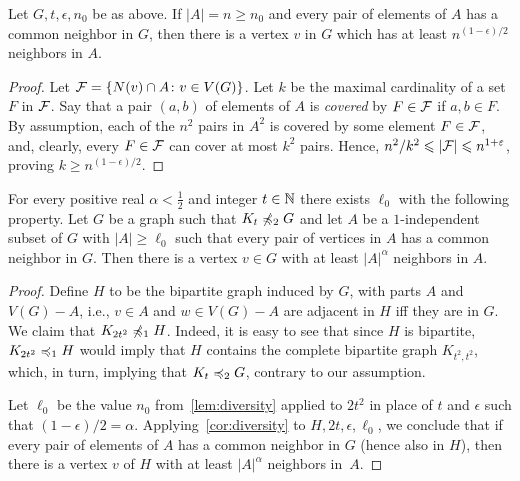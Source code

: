 \begin{corollary}\label{cor:diversity}
  Let $G,t,\epsilon,n_0$ be as above.
  If $|A|=n\ge n_0$ and every pair of elements of $A$ has a common neighbor in $G$,
  then there is a vertex $v$ in $G$ which has at least $n^{(1-\epsilon)/2}$ neighbors in $A$.
\end{corollary}
\begin{proof}Let ${\cal F}=\set{N(v)\cap A\colon v\in V(G)}$. 
  Let $k$ be the maximal cardinality of a set $F$ in ${\cal F}$.
  Say that a pair $(a,b)$ of elements of $A$ is \emph{covered} by $F\in {\cal F}$
  if  $a,b\in F$.
  By assumption, each of the $n^2$ pairs in $A^2$ is covered by some element $F\in {\cal F}$, and,
  clearly, every $F\in {\cal F}$ can cover at most $k^2$ pairs. 
  Hence, $n^2/k^2\le |{\cal F}|\le  n^{1+\epsilon}$, proving $k\ge n^{(1-\epsilon)/2}$.
\end{proof}

\begin{corollary}\label{cor:biversity}
    For every positive real $\alpha<\frac 1 2$ and integer $t\in\N$ there exists $\ell_0$ with the following property.
  Let $G$ be a graph such that $K_t\not\minor_2 G$
  and let
  $A$ be a $1$-independent subset of $G$ with $|A|\ge \ell_0$ such that every pair of vertices in $A$ has a common neighbor in $G$.
   Then there is a vertex $v\in G$
  with at least $|A|^{\alpha}$ neighbors in $A$.
\end{corollary}
\begin{proof}\label{pf:}
  Define $H$ to be the bipartite graph induced 
  by $G$, with parts $A$ and $V(G)-A$, i.e.,  $v\in A$ and $w\in V(G)-A$ are adjacent in $H$ iff they are in $G$. 
  We claim that $K_{2t^2}\not\minor_1 H$. Indeed, it is easy to see that 
  since $H$ is bipartite, $K_{2t^2}\minor_1 H$ would imply that $H$ contains the 
  complete bipartite graph $K_{t^2,t^2}$,  which, in turn, implying that $K_{t}\minor_2 G$, contrary to our assumption.  

  Let $\ell_0$
    be the value $n_0$ from~\cref{lem:diversity} applied to $2t^2$ in place of $t$ and $\epsilon$ such that $(1-\epsilon)/2=\alpha$. Applying~\cref{cor:diversity} to $H,2t,\epsilon,\ell_0$, we conclude that if every pair of elements of $A$ has a common neighbor in $G$
    (hence also in $H$), then there is a vertex $v$
    of $H$ with at least $|A|^{\alpha}$ neighbors in~$A$.
\end{proof}


